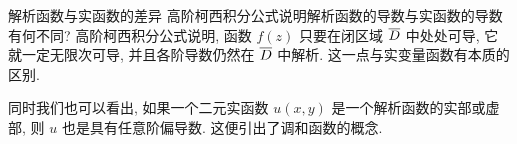 \begin{frame}{解析函数与实函数的差异}
\onslide<+->
高阶柯西积分公式说明解析函数的导数与实函数的导数有何不同?
\onslide<+->
高阶柯西积分公式说明, 函数 $f(z)$ 只要在闭区域 $\overline D$ 中处处可导, 它就一定无限次可导, 并且各阶导数仍然在 $\overline D$ 中解析.
\onslide<+->
\alert{这一点与实变量函数有本质的区别.}

\onslide<+->
同时我们也可以看出, 如果一个二元实函数 $u(x,y)$ 是一个解析函数的实部或虚部, 则 $u$ 也是具有任意阶偏导数.
\onslide<+->
这便引出了调和函数的概念.
\end{frame}


